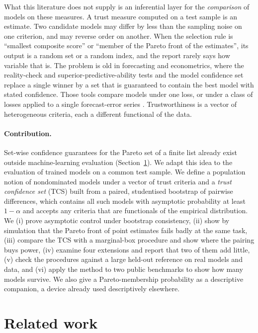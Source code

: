 \documentclass[pdflatex,sn-mathphys-num,iicol]{sn-jnl}
\theoremstyle{thmstyleone}
\theoremstyle{thmstyletwo}
\begin{document}
What this literature does not supply is an inferential layer for the \emph{comparison} of models on these measures. A trust measure computed on a test sample is an estimate. Two candidate models may differ by less than the sampling noise on one criterion, and may reverse order on another. When the selection rule is ``smallest composite score'' or ``member of the Pareto front of the estimates'', its output is a random set or a random index, and the report rarely says how variable that is. The problem is old in forecasting and econometrics, where the reality-check and superior-predictive-ability tests \cite{white2000,hansen2005spa} and the model confidence set \cite{hansen2011mcs} replace a single winner by a set that is guaranteed to contain the best model with stated confidence. Those tools compare models under one loss, or under a class of losses applied to a single forecast-error series \cite{arvanitis2021,jin2017}. Trustworthiness is a vector of heterogeneous criteria, each a different functional of the data.

\paragraph{Contribution.} Set-wise confidence guarantees for the Pareto set of a finite list already exist outside machine-learning evaluation (Section~\ref{sec:related}). We adapt this idea to the evaluation of trained models on a common test sample. We define a population notion of nondominated models under a vector of trust criteria and a \emph{trust confidence set} (TCS) built from a paired, studentised bootstrap of pairwise differences, which contains all such models with asymptotic probability at least $1-\alpha$ and accepts any criteria that are functionals of the empirical distribution. We (i) prove asymptotic control under bootstrap consistency, (ii) show by simulation that the Pareto front of point estimates fails badly at the same task, (iii) compare the TCS with a marginal-box procedure and show where the pairing buys power, (iv) examine four extensions and report that two of them add little, (v) check the procedures against a large held-out reference on real models and data, and (vi) apply the method to two public benchmarks to show how many models survive. We also give a Pareto-membership probability as a descriptive companion, a device already used descriptively elsewhere.

\section{Related work}\label{sec:related}
\end{document}
